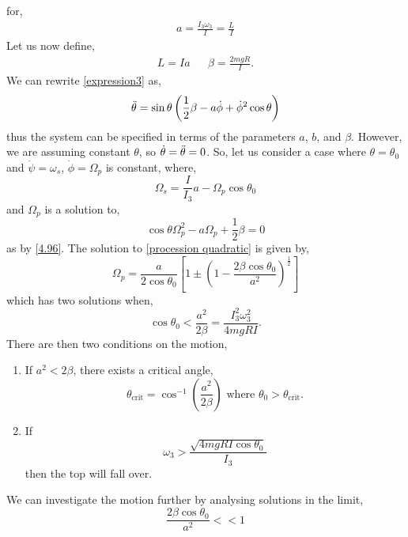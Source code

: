\documentclass{book}
\begin{document}
for,
\begin{align}
	a = \frac{I_3\omega_3}{I} = \frac{L}{I}
\end{align}
Let us now define,
\begin{align}
	L = Ia && \beta = \frac{2mgR}{I}. 
\end{align}
We can rewrite \eqref{expression3} as,
\begin{equation}
	\Ddot{\theta} = \sin\theta\left(\frac{1}{2}\beta - a \Dot{\phi} + \Dot{\phi}^2\cos\theta\right) \label{4.96}
\end{equation}
thus the system can be specified in terms of the parameters $a$, $b$, and $\beta$. However, we are assuming constant $\theta$, so $\Dot{\theta} = \Ddot{\theta} = 0$. So, let us consider a case where $\theta = \theta_0$ and $\Dot{\psi} = \omega_s$, $\Dot{\phi}=\Omega_p$ is constant, where,
\begin{equation}
	\Omega_s = \frac{I}{I_3}a - \Omega_p\cos\theta_0
\end{equation}
and $\Omega_p$ is a solution to,
\begin{equation}
	\cos\theta \Omega_p^2 - a\Omega_p + \frac{1}{2}\beta = 0 \label{procession quadratic}
\end{equation}
as by \eqref{4.96}. The solution to \eqref{procession quadratic} is given by,
\begin{equation}
	\Omega_p = \frac{a}{2\cos\theta_0}\left[1\pm\left(1 - \frac{2\beta\cos\theta_0}{a^2}\right)^{\frac{1}{2}}\right]
\end{equation}
which has two solutions when,
\begin{equation}
	\cos\theta_0 < \frac{a^2}{2\beta} = \frac{I_3^2\omega_3^2}{4mgRI}.
\end{equation}
There are then two conditions on the motion,
\begin{enumerate}
	\item  If $a^2 < 2\beta$, there exists a critical angle,
	\begin{equation}
		\theta_{\text{crit}} = \cos^{-1}\left(\frac{a^2}{2\beta}\right)\text{ where } \theta_0 > \theta_{\text{crit}}.
	\end{equation}
	\item If 
	\begin{equation}
		\omega_3 > \frac{\sqrt{4mgRI\cos\theta_0}}{I_3}\label{condition}
	\end{equation}
	then the top will fall over.
\end{enumerate}
We can investigate the motion further by analysing solutions in the limit,
\begin{equation}
	\frac{2\beta \cos\theta_0}{a^2} << 1
\end{equation}
\end{document}
